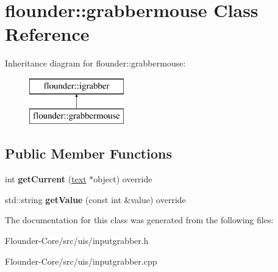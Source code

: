 \hypertarget{classflounder_1_1grabbermouse}{}\section{flounder\+:\+:grabbermouse Class Reference}
\label{classflounder_1_1grabbermouse}
Inheritance diagram for flounder\+:\+:grabbermouse\+:\begin{figure}[H]
\begin{center}
\leavevmode
\includegraphics[height=2.000000cm]{classflounder_1_1grabbermouse}
\end{center}
\end{figure}
\subsection*{Public Member Functions}
\begin{DoxyCompactItemize}
\item 
\mbox{\label{classflounder_1_1grabbermouse_a6c5ea248350f50c805ede82b2f7b307d}} 
int {\bfseries get\+Current} (\hyperlink{classflounder_1_1text}{text} $\ast$object) override
\item 
\mbox{\label{classflounder_1_1grabbermouse_a630d39a6efe37372abd012b7dda0f698}} 
std\+::string {\bfseries get\+Value} (const int \&value) override
\end{DoxyCompactItemize}


The documentation for this class was generated from the following files\+:\begin{DoxyCompactItemize}
\item 
Flounder-\/\+Core/src/uis/inputgrabber.\+h\item 
Flounder-\/\+Core/src/uis/inputgrabber.\+cpp\end{DoxyCompactItemize}
